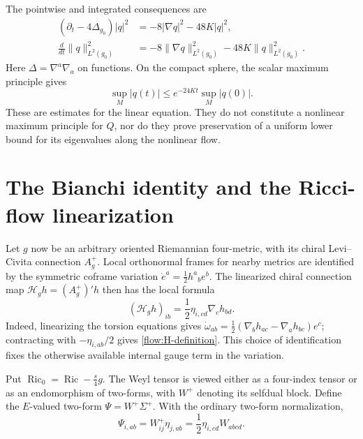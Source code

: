 \documentclass[11pt]{article}
\numberwithin{equation}{section}
\theoremstyle{definition}
\theoremstyle{remark}
\DeclareMathOperator{\Ric}{Ric}
\begin{document}
The pointwise and integrated consequences are
\begin{align}
 (\partial_t-4\Delta_{g_0})\lvert q\rvert^2
    &=-8\lvert\nabla q\rvert^2-48K\lvert q\rvert^2,
      \label{flow:linear-pointwise-decay}\\
 \frac{d}{dt}\lVert q\rVert_{L^2(g_0)}^2
    &=-8\lVert\nabla q\rVert_{L^2(g_0)}^2
      -48K\lVert q\rVert_{L^2(g_0)}^2.\nonumber
\end{align}
Here $\Delta=\nabla^a\nabla_a$ on functions.  On the compact sphere,
the scalar maximum principle gives
\begin{equation}
 \sup_M\lvert q(t)\rvert
       \leq e^{-24Kt}\sup_M\lvert q(0)\rvert.
 \label{flow:linear-sup-bound}
\end{equation}
These are estimates for the linear equation.  They do not constitute a
nonlinear maximum principle for $Q$, nor do they prove preservation of
a uniform lower bound for its eigenvalues along the nonlinear flow.

\section{The Bianchi identity and the Ricci-flow linearization}
\label{sec:chiral-bianchi}

Let $g$ now be an arbitrary oriented Riemannian four-metric, with its
chiral Levi--Civita connection $A_g^+$.  Local orthonormal frames for
nearby metrics are identified by the symmetric coframe variation
$\dot e^a=\frac12h^a{}_be^b$.  The linearized chiral connection map
$\mathcal H_g h=(A_g^+)'h$ then has the local formula
\begin{equation}
 (\mathcal H_g h)_{ib}
       =\frac12\eta_{i,cd}\nabla_ch_{bd}.
 \label{flow:H-definition}
\end{equation}
Indeed, linearizing the torsion equations gives
$\dot\omega_{ab}=\frac12(\nabla_bh_{ac}-\nabla_ah_{bc})e^c$;
contracting with $-\eta_{i,ab}/2$ gives
\eqref{flow:H-definition}.  This choice of identification fixes the
otherwise available internal gauge term in the variation.

Put $\Ric_0=\operatorname{Ric}-\frac{s}{4}g$.  The Weyl tensor is
viewed either as a four-index tensor or as an endomorphism of two-forms,
with $W^+$ denoting its selfdual block.  Define the $E$-valued two-form
$\Psi=W^+\Sigma^+$.  With the ordinary two-form normalization,
\begin{equation}
 \Psi_{i,ab}=W^+_{ij}\eta_{j,ab}
           =\frac12\eta_{i,cd}W_{abcd}.
 \label{flow:W-projection}
\end{equation}
\end{document}
